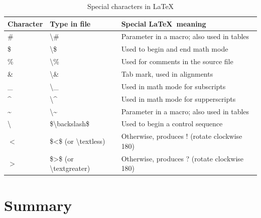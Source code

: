 \documentclass[a4paper,11pt,UTF8,openright]{book}
\begin{document}
\begin{center}
  \begin{table}[!htbp]
    \caption{Special characters in \LaTeX}
    \label{tab:special characters}
    \begin{tabular}{@{}lll@{}}
      \toprule
      \textbf{Character} & \textbf{Type in file} & \textbf{Special \LaTeX\ meaning}  \\ 
      \midrule
      \#	& \textbackslash\# & Parameter in a macro; also used in tables \\
      \$	& \textbackslash\$ & Used to begin and end math mode \\
      \%	& \textbackslash\% & Used for comments in the source file \\
      \&	& \textbackslash\& & Tab mark, used in alignments \\
      \_	& \textbackslash\_ & Used in math mode for subscripts \\
      \^{}	& \textbackslash\^{} & Used in math mode for supperscripts \\
      \~{}	& \textbackslash\~{} & Parameter in a macro; also used in tables \\
      \textbackslash	& \$\textbackslash backslash\$ & Used to begin a control sequence \\
      $<$	& \$<\$ (or \textbackslash textless) & Otherwise, produces ! (rotate clockwise 180\degree) \\
      $>$	& \$>\$ (or \textbackslash textgreater) & Otherwise, produces ? (rotate clockwise 180\degree) \\
      \bottomrule
    \end{tabular}
  \end{table}
\end{center}



\chapter{Summary}
\lipsum[1-3]

{}


\listoffigures

\listoftables
\end{document}

